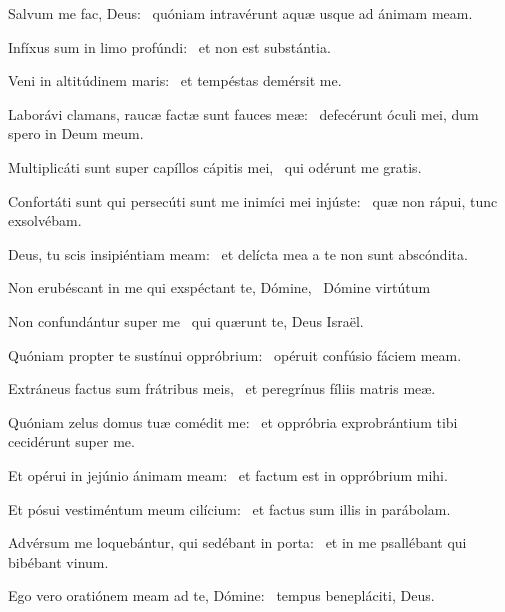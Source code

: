 \item Salvum me fac, Deus:~\psstar{} quóniam intravérunt aquæ usque ad ánimam meam.

\item Infíxus sum in limo profúndi:~\psstar{} et non est substántia.

\item Veni in altitúdinem maris:~\psstar{} et tempéstas demérsit me.

\item Laborávi clamans, raucæ factæ sunt fauces meæ:~\psstar{} defecérunt óculi mei, dum spero in Deum meum.

\item Multiplicáti sunt super capíllos cápitis mei,~\psstar{} qui odérunt me gratis.

\item Confortáti sunt qui persecúti sunt me inimíci mei injúste:~\psstar{} quæ non rápui, tunc exsolvébam.

\item Deus, tu scis insipiéntiam meam:~\psstar{} et delícta mea a te non sunt abscóndita.

\item Non erubéscant in me qui exspéctant te, Dómine,~\psstar{} Dómine virtútum

\item Non confundántur super me~\psstar{} qui quærunt te, Deus Israël.

\item Quóniam propter te sustínui oppróbrium:~\psstar{} opéruit confúsio fáciem meam.

\item Extráneus factus sum frátribus meis,~\psstar{} et peregrínus fíliis matris meæ.

\item Quóniam zelus domus tuæ comédit me:~\psstar{} et oppróbria exprobrántium tibi cecidérunt super me.

\item Et opérui in jejúnio ánimam meam:~\psstar{} et factum est in oppróbrium mihi.

\item Et pósui vestiméntum meum cilícium:~\psstar{} et factus sum illis in parábolam.

\item Advérsum me loquebántur, qui sedébant in porta:~\psstar{} et in me psallébant qui bibébant vinum.

\item Ego vero oratiónem meam ad te, Dómine:~\psstar{} tempus benepláciti, Deus.

